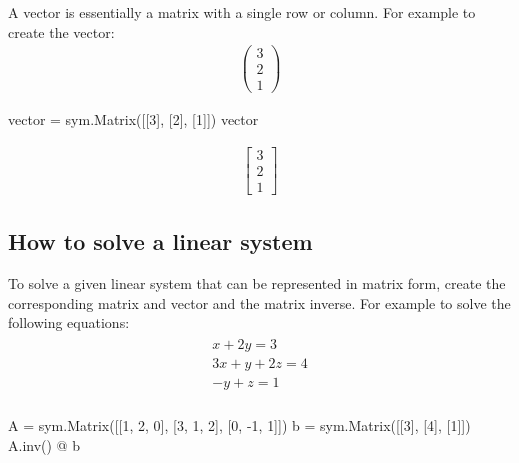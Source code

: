 A vector is essentially a matrix with a single row or column. For example to
create the vector:
\begin{equation*}
\begin{split}
    \begin{pmatrix}
    3 \\
    2 \\
    1
    \end{pmatrix}
\end{split}
\end{equation*}



\begin{pyin}
vector = sym.Matrix([[3], [2], [1]])
vector
\end{pyin}




\begin{equation*}
\begin{split}\displaystyle \left[\begin{matrix}3\\2\\1\end{matrix}\right]\end{split}
\end{equation*}




\subsection{How to solve a linear system}
\label{\detokenize{tools-for-mathematics/04-matrices/how/main:how-to-solve-a-linear-system}}

To solve a given linear system that can be represented in matrix form, create
the corresponding matrix and vector and the matrix inverse. For example to
solve the following equations:
\begin{equation*}
\begin{split}
    \begin{array}{l}
        x + 2y = 3\\
        3x + y + 2z = 4\\
        - y + z = 1\\
    \end{array}
\end{split}
\end{equation*}



\begin{pyin}
A = sym.Matrix([[1, 2, 0], [3, 1, 2], [0, -1, 1]])
b = sym.Matrix([[3], [4], [1]])
A.inv() @ b
\end{pyin}





